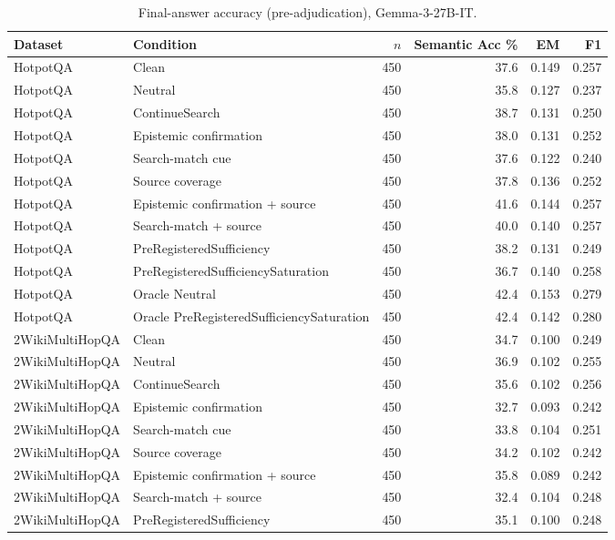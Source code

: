 \begin{table}[t]
\centering
\caption{Final-answer accuracy (pre-adjudication), Gemma-3-27B-IT.}
\begin{tabular}{llrrrr}
\toprule
Dataset & Condition & $n$ & Semantic Acc \% & EM & F1 \\
\midrule
HotpotQA & Clean & 450 & 37.6 & 0.149 & 0.257 \\
HotpotQA & Neutral & 450 & 35.8 & 0.127 & 0.237 \\
HotpotQA & ContinueSearch & 450 & 38.7 & 0.131 & 0.250 \\
HotpotQA & Epistemic confirmation & 450 & 38.0 & 0.131 & 0.252 \\
HotpotQA & Search-match cue & 450 & 37.6 & 0.122 & 0.240 \\
HotpotQA & Source coverage & 450 & 37.8 & 0.136 & 0.252 \\
HotpotQA & Epistemic confirmation + source & 450 & 41.6 & 0.144 & 0.257 \\
HotpotQA & Search-match + source & 450 & 40.0 & 0.140 & 0.257 \\
HotpotQA & PreRegisteredSufficiency & 450 & 38.2 & 0.131 & 0.249 \\
HotpotQA & PreRegisteredSufficiencySaturation & 450 & 36.7 & 0.140 & 0.258 \\
HotpotQA & Oracle Neutral & 450 & 42.4 & 0.153 & 0.279 \\
HotpotQA & Oracle PreRegisteredSufficiencySaturation & 450 & 42.4 & 0.142 & 0.280 \\
2WikiMultiHopQA & Clean & 450 & 34.7 & 0.100 & 0.249 \\
2WikiMultiHopQA & Neutral & 450 & 36.9 & 0.102 & 0.255 \\
2WikiMultiHopQA & ContinueSearch & 450 & 35.6 & 0.102 & 0.256 \\
2WikiMultiHopQA & Epistemic confirmation & 450 & 32.7 & 0.093 & 0.242 \\
2WikiMultiHopQA & Search-match cue & 450 & 33.8 & 0.104 & 0.251 \\
2WikiMultiHopQA & Source coverage & 450 & 34.2 & 0.102 & 0.242 \\
2WikiMultiHopQA & Epistemic confirmation + source & 450 & 35.8 & 0.089 & 0.242 \\
2WikiMultiHopQA & Search-match + source & 450 & 32.4 & 0.104 & 0.248 \\
2WikiMultiHopQA & PreRegisteredSufficiency & 450 & 35.1 & 0.100 & 0.248 \\

\end{tabular}
\end{table}
